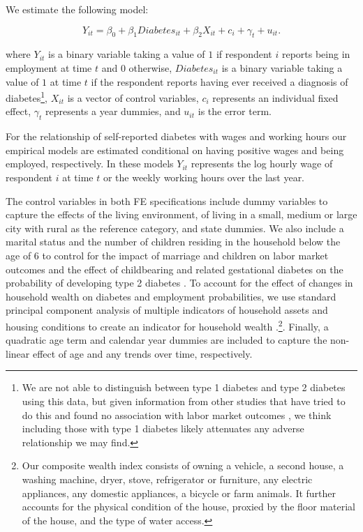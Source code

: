 \documentclass[12pt,english]{article}
\begin{document}
We estimate the following model:

\noindent 
\begin{equation}
Y_{it}=\beta_{0}+\beta_{1}Diabetes_{it}+\beta_{2}X_{it}+c_{i}+\gamma_{t}+u_{it}.\label{eq:employed}
\end{equation}


where $Y_{it}$ is a binary variable taking a value of $1$ if respondent $i$ reports being in employment at time $t$ and $0$ otherwise, $Diabetes_{it}$ is a binary variable taking a value of $1$ at time $t$ if the respondent reports having ever received a diagnosis of diabetes\footnote{We are not able to distinguish between type 1 diabetes and type 2 diabetes using this data, but given information from other studies that have tried to do this and found no association with labor market outcomes \parencite{Minor2010,Minor2015}, we think including those with type 1 diabetes likely attenuates any adverse relationship we may find.}, $X_{it}$ is a vector of control variables, $c_{i}$ represents an individual fixed effect, $\gamma_{t}$ represents a year dummies, and $u_{it}$ is the error term.

For the relationship of self-reported diabetes with wages and working hours our empirical models are estimated conditional on having positive wages and being employed, respectively. In these models $Y_{it}$ represents the log hourly wage of respondent $i$ at time $t$ or the weekly working hours over the last year.

The control variables in both \ac{FE} specifications include dummy variables to capture the effects of the living environment,
of living in a small, medium or large city with rural as the reference category, and state dummies. We also include a marital status and the number of children residing in the household below the age of 6 to control for the impact of marriage and children
on labor market outcomes and the effect of childbearing and related gestational diabetes on the probability of developing type 2 diabetes
\parencite{Bellamy2009}. To account for the effect of changes in household wealth on diabetes and employment probabilities, we use standard
principal component analysis of multiple indicators of household assets and housing conditions to create an indicator for household wealth
\parencite{Filmer2001}.\footnote{Our composite wealth index consists of owning a vehicle, a second house, a washing machine, dryer, stove, refrigerator or furniture, any electric appliances, any domestic appliances, a bicycle or farm animals. It further accounts for the physical condition of the house, proxied by the floor material of the house, and the type of water access.}. Finally, a quadratic age term and calendar year dummies are included to capture the non-linear effect of age and any trends over time, respectively.
\end{document}
